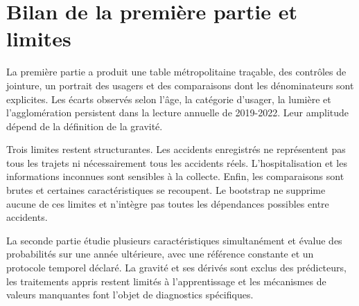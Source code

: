 \clearpage
\section{Bilan de la première partie et limites}
La première partie a produit une table métropolitaine traçable, des contrôles de
jointure, un portrait des usagers et des comparaisons dont les dénominateurs sont
explicites. Les écarts observés selon l'âge, la catégorie d'usager, la lumière et
l'agglomération persistent dans la lecture annuelle de 2019-2022. Leur amplitude
dépend de la définition de la gravité.

Trois limites restent structurantes. Les accidents enregistrés ne représentent pas
tous les trajets ni nécessairement tous les accidents réels. L'hospitalisation et
les informations inconnues sont sensibles à la collecte. Enfin, les comparaisons
sont brutes et certaines caractéristiques se recoupent. Le bootstrap ne supprime
aucune de ces limites et n'intègre pas toutes les dépendances possibles entre accidents.

La seconde partie étudie plusieurs caractéristiques simultanément et évalue des
probabilités sur une année ultérieure, avec une référence constante et un protocole
temporel déclaré. La gravité et ses dérivés sont exclus des prédicteurs, les traitements
appris restent limités à l'apprentissage et les mécanismes de valeurs manquantes
font l'objet de diagnostics spécifiques.
